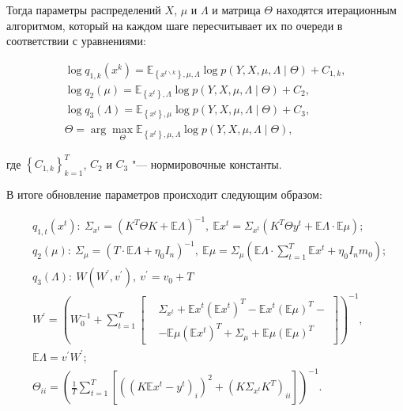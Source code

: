 Тогда параметры распределений $X$, $\mu$ и $\Lambda$ и матрица $\Theta$ находятся итерационным алгоритмом, который на каждом шаге пересчитывает их по очереди в соответствии с уравнениями:

\begin{align*}
	\log{q_{1,k}\left(x^k\right)}=\mathbb{E}_{\left\{x^{t \backslash k}\right\},\mu,\Lambda}\log{p\left(Y,X,\mu,\Lambda\mid\Theta\right)}+C_{1,k}, \\
	\log{q_2\left(\mu\right)}=\mathbb{E}_{\left\{x^t\right\},\Lambda}\log{p\left(Y,X,\mu,\Lambda\mid\Theta\right)}+C_2, \\
	\log{q_3\left(\Lambda\right)}=\mathbb{E}_{\left\{x^t\right\},\mu}\log{p\left(Y,X,\mu,\Lambda\mid\Theta\right)}+C_3, \\
	\Theta=\arg{\max_\Theta{\mathbb{E}_{\left\{x^t\right\},\mu,\Lambda}\log{p\left(Y,X,\mu,\Lambda\mid\Theta\right)}}},
\end{align*}

\noindent где $\left\{C_{1,k}\right\}_{k=1}^T$, $C_2$ и $C_3$ "--- нормировочные константы.

В итоге обновление параметров происходит следующим образом:

\begin{align*}
	&q_{1,t}\left(x^t\right):\ \Sigma_{x^t}=\left(K^T\Theta K+\mathbb{E}\Lambda\right)^{-1},\ \mathbb{E}x^t=\Sigma_{x^t}\left(K^T\Theta y^t+\mathbb{E}\Lambda\cdot\mathbb{E}\mu\right); \\
	&q_2\left(\mu\right):\ \Sigma_\mu=\left(T\cdot\mathbb{E}\Lambda+\eta_0I_n\right)^{-1},\ \mathbb{E}\mu=\Sigma_\mu\left(\mathbb{E}\Lambda\cdot\sum_{t=1}^{T}{\mathbb{E}x^t}+\eta_0I_nm_0\right); \\
	&q_3\left(\Lambda\right):\ W\left(W^\prime,v^\prime\right),\ v^\prime=v_0+T \\
	&W^\prime=\left(W_0^{-1}+\sum_{t=1}^{T}\left[
	\begin{aligned}
		&\Sigma_{x^t} + \mathbb{E}x^t\left(\mathbb{E}x^t\right)^T - \mathbb{E}x^t\left(\mathbb{E}\mu\right)^T - \\
		&- \mathbb{E}\mu\left(\mathbb{E}x^t\right)^T + \Sigma_\mu + \mathbb{E}\mu\left(\mathbb{E}\mu\right)^T
	\end{aligned}
	\right]\right)^{-1}, \\
	&\mathbb{E}\Lambda=v^\prime W^\prime; \\
	&\Theta_{ii}=\left(\frac{1}{T}\sum_{t=1}^{T}\left[\left(\left(K\mathbb{E}x^t - y^t\right)_i\right)^2 + \left(K\Sigma_{x^t}K^T\right)_{ii}\right]\right)^{-1}.
\end{align*}

